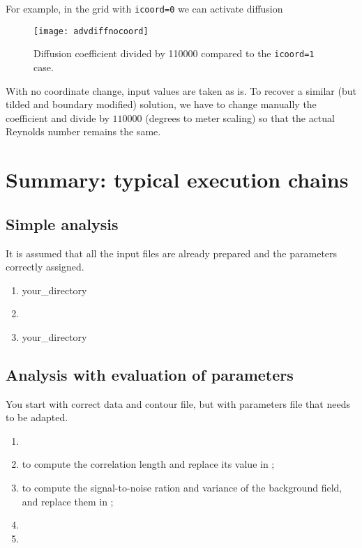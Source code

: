 For example, in the grid with \texttt{icoord=0} we can activate diffusion

\begin{figure}[H]
\centering
\texttt{[image: advdiffnocoord]}
\caption{Diffusion coefficient divided by 110000 compared to the 
\texttt{icoord=1} case.}
\end{figure}


With no coordinate change, input values are taken as is. To recover a similar (but tilded and boundary modified) solution, we have to change manually the coefficient and divide by $110000$ (degrees to meter scaling) so that the actual Reynolds number remains the same.


\section{Summary: typical execution chains}


\subsection{Simple analysis}

It is assumed that all the input files are already prepared and the parameters correctly assigned.

\begin{enumerate}
\item {} your\_directory
\item {}
\item {} your\_directory
\end{enumerate}



\subsection{Analysis with evaluation of parameters}

You start with correct data and contour file, but with parameters file that needs to be adapted.

\begin{enumerate}
\item {}
\item {} \qquad to compute the correlation length and replace its value in ;
\item {} \qquad to compute the signal-to-noise ration and variance of the background field, and replace them in ;
\item {}
\item {}
\end{enumerate}



